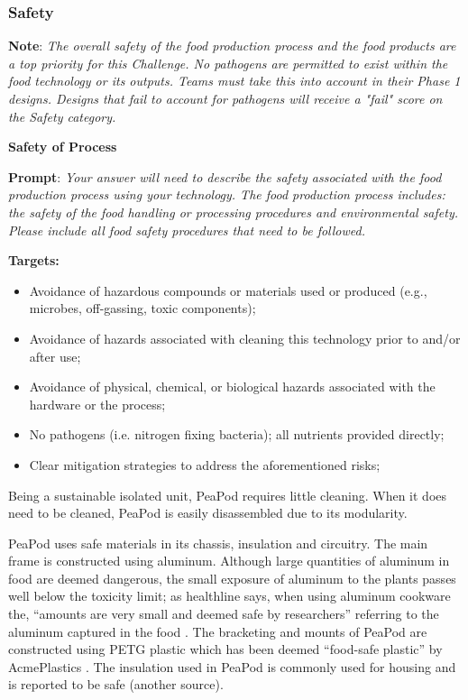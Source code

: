 \documentclass{report}
\begin{document}

\newpage

\subsubsection{Safety}
\label{sec:safety}

\textbf{Note}: \textit{The overall safety of the food production process and the food products are a top priority for this Challenge. No pathogens are permitted to exist within the food technology or its outputs.  Teams must take this into account in their Phase 1 designs. Designs that fail to account for pathogens will receive a "fail" score on the Safety category.}

\textbf{Safety of Process}
\label{sec:safety-process}

\textbf{Prompt}: \textit{Your answer will need to describe the safety associated with the food production process using your technology. The food production process includes: the safety of the food handling or processing procedures and environmental safety. Please include all food safety procedures that need to be followed.}

\textbf{Targets:}
\begin{itemize}
    \item Avoidance of hazardous compounds or materials used or produced (e.g., microbes, off-gassing, toxic components);
    \item Avoidance of hazards associated with cleaning this technology prior to and/or after use;
    \item Avoidance of physical, chemical, or biological hazards associated with the hardware or the process;
    \item No pathogens (i.e. nitrogen fixing bacteria); all nutrients provided directly;
    \item Clear mitigation strategies to address the aforementioned risks;
\end{itemize}


Being a sustainable isolated unit, PeaPod requires little cleaning. When it does need to be cleaned, PeaPod is easily disassembled due to its modularity. 

PeaPod uses safe materials in its chassis, insulation and circuitry. 
The main frame is constructed using aluminum. Although large quantities of aluminum in food are deemed dangerous, the small exposure of aluminum to the plants passes well below the toxicity limit; as healthline says, when using aluminum cookware the, “amounts are very small and deemed safe by researchers” referring to the aluminum captured in the food %
. 
The bracketing and mounts of PeaPod are constructed using PETG plastic which has been deemed “food-safe plastic” by AcmePlastics %
. The insulation used in PeaPod is commonly used for housing and is reported to be safe (another source). 
\end{document}

